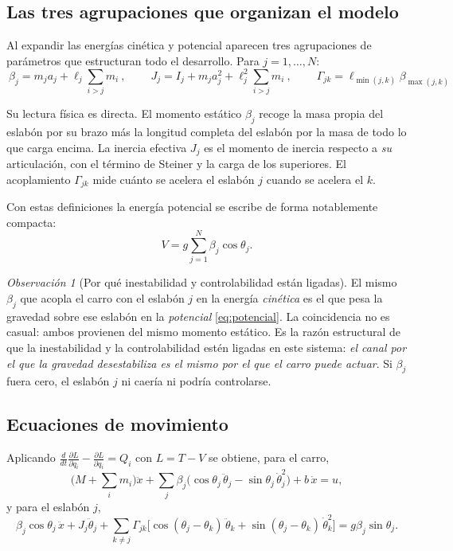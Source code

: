 \documentclass[11pt,letterpaper]{article}
\theoremstyle{definition}
\theoremstyle{plain}
\theoremstyle{remark}
\newtheorem{observacion}[definicion]{Observación}
\begin{document}
\subsection{Las tres agrupaciones que organizan el modelo}

Al expandir las energías cinética y potencial aparecen tres agrupaciones de
parámetros que estructuran todo el desarrollo. Para $j=1,\dots,N$:
\begin{equation}
\boxed{\ \beta_j=m_ja_j+\ell_j\sum_{i>j}m_i\ },\qquad
\boxed{\ J_j=I_j+m_ja_j^2+\ell_j^2\sum_{i>j}m_i\ },\qquad
\boxed{\ \Gamma_{jk}=\ell_{\min(j,k)}\beta_{\max(j,k)}\ }
\label{eq:agrupaciones}
\end{equation}

Su lectura física es directa. El momento estático $\beta_j$ recoge la masa
propia del eslabón por su brazo más la longitud completa del eslabón por la masa
de todo lo que carga encima. La inercia efectiva $J_j$ es el momento de inercia
respecto a \emph{su} articulación, con el término de Steiner y la carga de los
superiores. El acoplamiento $\Gamma_{jk}$ mide cuánto se acelera el eslabón $j$
cuando se acelera el $k$.

Con estas definiciones la energía potencial se escribe de forma notablemente
compacta:
\begin{equation}
V=g\sum_{j=1}^{N}\beta_j\cos\theta_j.
\label{eq:potencial}
\end{equation}

\begin{observacion}[Por qué inestabilidad y controlabilidad están ligadas]
\label{obs:beta}
El mismo $\beta_j$ que acopla el carro con el eslabón $j$ en la energía
\emph{cinética} es el que pesa la gravedad sobre ese eslabón en la
\emph{potencial} \cref{eq:potencial}. La coincidencia no es casual: ambos
provienen del mismo momento estático. Es la razón estructural de que la
inestabilidad y la controlabilidad estén ligadas en este sistema: \emph{el canal
por el que la gravedad desestabiliza es el mismo por el que el carro puede
actuar}. Si $\beta_j$ fuera cero, el eslabón $j$ ni caería ni podría
controlarse.
\end{observacion}

\subsection{Ecuaciones de movimiento}

Aplicando $\frac{d}{dt}\frac{\partial L}{\partial\dot q_i}-\frac{\partial L}{\partial q_i}=Q_i$
con $L=T-V$ se obtiene, para el carro,
\begin{equation}
\Big(M+\sum_i m_i\Big)\ddot x+\sum_{j}\beta_j\big(\cos\theta_j\,\ddot\theta_j-\sin\theta_j\,\dot\theta_j^2\big)+b\,\dot x=u,
\label{eq:eomcarro}
\end{equation}
y para el eslabón $j$,
\begin{equation}
\beta_j\cos\theta_j\,\ddot x+J_j\ddot\theta_j+\sum_{k\neq j}\Gamma_{jk}\big[\cos(\theta_j-\theta_k)\,\ddot\theta_k+\sin(\theta_j-\theta_k)\,\dot\theta_k^2\big]=g\beta_j\sin\theta_j.
\label{eq:eomeslabon}
\end{equation}
\end{document}
